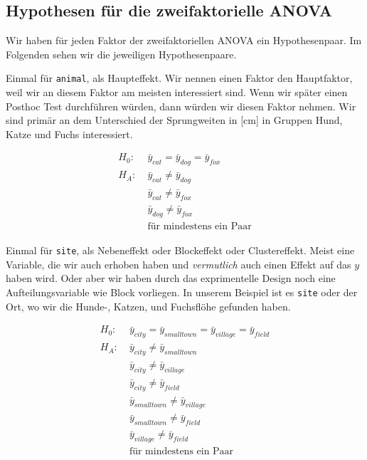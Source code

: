 \documentclass[
  letterpaper,
]{scrbook}
\begin{document}
\hypertarget{hypothesen-fuxfcr-die-zweifaktorielle-anova}{%
\subsection{Hypothesen für die zweifaktorielle
ANOVA}\label{hypothesen-fuxfcr-die-zweifaktorielle-anova}}

Wir haben für jeden Faktor der zweifaktoriellen ANOVA ein
Hypothesenpaar. Im Folgenden sehen wir die jeweiligen Hypothesenpaare.

Einmal für \texttt{animal}, als Haupteffekt. Wir nennen einen Faktor den
Hauptfaktor, weil wir an diesem Faktor am meisten interessiert sind.
Wenn wir später einen Posthoc Test durchführen würden, dann würden wir
diesen Faktor nehmen. Wir sind primär an dem Unterschied der
Sprungweiten in {[}cm{]} in Gruppen Hund, Katze und Fuchs interessiert.

\[
\begin{align*}
H_0: &\; \bar{y}_{cat} = \bar{y}_{dog} = \bar{y}_{fox}\\
H_A: &\; \bar{y}_{cat} \ne \bar{y}_{dog}\\
\phantom{H_A:} &\; \bar{y}_{cat} \ne \bar{y}_{fox}\\
\phantom{H_A:} &\; \bar{y}_{dog} \ne \bar{y}_{fox}\\
\phantom{H_A:} &\; \mbox{für mindestens ein Paar}
\end{align*}
\]

Einmal für \texttt{site}, als Nebeneffekt oder Blockeffekt oder
Clustereffekt. Meist eine Variable, die wir auch erhoben haben und
\emph{vermutlich} auch einen Effekt auf das \(y\) haben wird. Oder aber
wir haben durch das exprimentelle Design noch eine Aufteilungsvariable
wie Block vorliegen. In unserem Beispiel ist es \texttt{site} oder der
Ort, wo wir die Hunde-, Katzen, und Fuchsflöhe gefunden haben.

\[
\begin{align*}
H_0: &\; \bar{y}_{city} = \bar{y}_{smalltown} = \bar{y}_{village} = \bar{y}_{field}\\
H_A: &\; \bar{y}_{city} \ne \bar{y}_{smalltown}\\
\phantom{H_A:} &\; \bar{y}_{city} \ne \bar{y}_{village}\\
\phantom{H_A:} &\; \bar{y}_{city} \ne \bar{y}_{field}\\
\phantom{H_A:} &\; \bar{y}_{smalltown} \ne \bar{y}_{village}\\
\phantom{H_A:} &\; \bar{y}_{smalltown} \ne \bar{y}_{field}\\
\phantom{H_A:} &\; \bar{y}_{village} \ne \bar{y}_{field}\\
\phantom{H_A:} &\; \mbox{für mindestens ein Paar}
\end{align*}
\]
\end{document}

